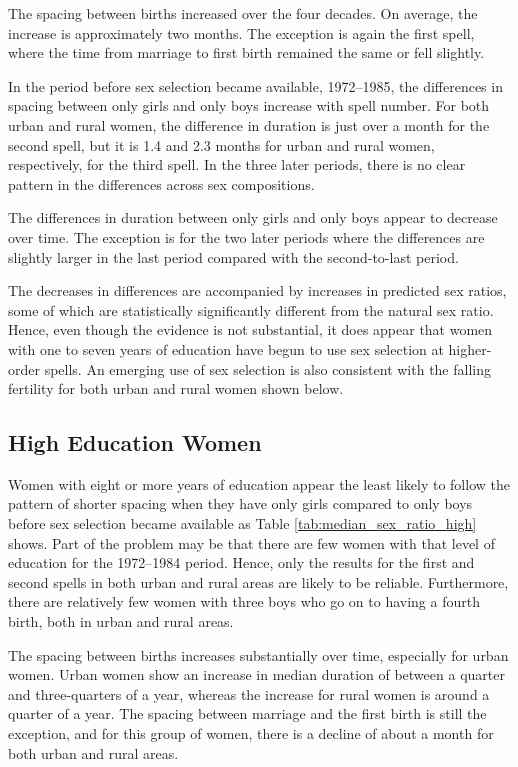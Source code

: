 \documentclass[12pt,letterpaper]{article}
\begin{document}
The spacing between births increased over the four decades.
On average, the increase is approximately two months.
The exception is again the first spell, where the time from
marriage to first birth remained the same or fell slightly.

In the period before sex selection became available, 1972--1985,
the differences in spacing between only girls and only boys
increase with spell number.
For both urban and rural women, the difference in duration is just over
a month for the second spell, but it is 1.4 and 2.3 months for urban and
rural women, respectively, for the third spell.
In the three later periods, there is no clear pattern
in the differences across sex compositions.

The differences in duration between only girls and only boys 
appear to decrease over time.
The exception is for the two later periods where the
differences are slightly larger in the last period compared
with the second-to-last period. 

The decreases in differences are accompanied by increases
in predicted sex ratios, some of which are statistically 
significantly different from the natural sex ratio.
Hence, even though the evidence is not substantial, it does
appear that women with one to seven years of education 
have begun to use sex selection at higher-order spells.
An emerging use of sex selection is also consistent with the falling
fertility for both urban and rural women shown below.

\subsection{High Education Women}



Women with eight or more years of education appear the least likely
to follow the pattern of shorter spacing when they have only girls
compared to only boys before sex selection became available as 
Table \ref{tab:median_sex_ratio_high} shows.
Part of the problem may be that there are few women with that level
of education for the 1972--1984 period.
Hence, only the results for the first and second spells in 
both urban and rural areas are likely to be reliable.
Furthermore, there are relatively few women with three boys who
go on to having a fourth birth, both in urban and rural areas.

The spacing between births increases substantially over time, especially
for urban women. 
Urban women show an increase in median duration of between a quarter
and three-quarters of a year, whereas the increase for rural women is 
around a quarter of a year.
The spacing between marriage and the first birth is still the
exception, and for this group of women, there is a decline of
about a month for both urban and rural areas.
\end{document}

